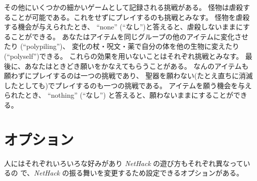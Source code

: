 その他にいくつかの細かいゲームとして記録される挑戦がある。
怪物は虐殺することが可能である。これをせずにプレイするのも挑戦とみなす。
怪物を虐殺する機会が与えられたとき、
``none'' (``なし'')と答えると、虐殺しないままにすることができる。
あなたはアイテムを同じグループの他のアイテムに変化させたり (``polypiling'')、
変化の杖・呪文・薬で自分の体を他の生物に変えたり(``polyself'')できる。
これらの効果を用いないことはそれぞれ挑戦とみなす。
最後に、あなたはときどき願いをかなえてもらうことがある。
なんのアイテムも願わずにプレイするのは一つの挑戦であり、
聖器を願わない(たとえ直ちに消滅したとしても)でプレイするのも一つの挑戦である。
アイテムを願う機会を与えられたとき、
``nothing'' (``なし'') と答えると、願わないままにすることができる。

\section{オプション}

人にはそれぞれいろいろな好みがあり {\it NetHack\/} の遊び方もそれぞれ異なっているの
で、{\it NetHack\/} の振る舞いを変更するため設定できるオプションがある。

